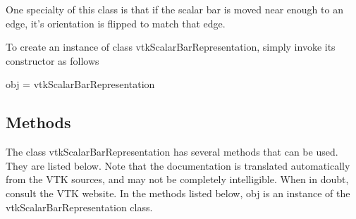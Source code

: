 One specialty of this class is that if the scalar bar is moved near enough to an edge, it's orientation is flipped to match that edge.

To create an instance of class vtk\-Scalar\-Bar\-Representation, simply invoke its constructor as follows \begin{DoxyVerb}  obj = vtkScalarBarRepresentation
\end{DoxyVerb}
 \hypertarget{vtkwidgets_vtkxyplotwidget_Methods}{}\subsection{Methods}\label{vtkwidgets_vtkxyplotwidget_Methods}
The class vtk\-Scalar\-Bar\-Representation has several methods that can be used. They are listed below. Note that the documentation is translated automatically from the V\-T\-K sources, and may not be completely intelligible. When in doubt, consult the V\-T\-K website. In the methods listed below, {\ttfamily obj} is an instance of the vtk\-Scalar\-Bar\-Representation class. 

